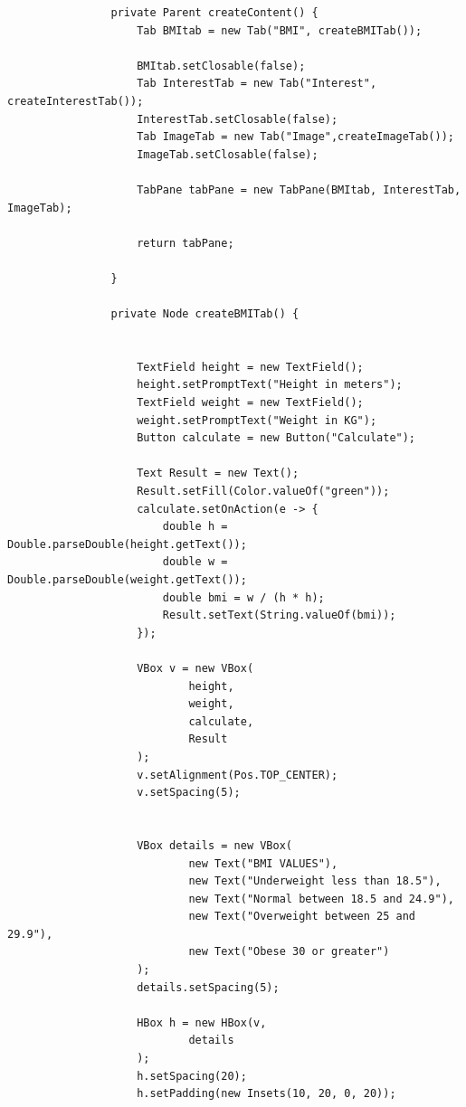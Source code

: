 \documentclass{book}
\begin{document}
{\begin{enumerate}
\begin{verbatim}
                private Parent createContent() {
                    Tab BMItab = new Tab("BMI", createBMITab());

                    BMItab.setClosable(false);
                    Tab InterestTab = new Tab("Interest", createInterestTab());
                    InterestTab.setClosable(false);
                    Tab ImageTab = new Tab("Image",createImageTab());
                    ImageTab.setClosable(false);

                    TabPane tabPane = new TabPane(BMItab, InterestTab, ImageTab);

                    return tabPane;

                }

                private Node createBMITab() {


                    TextField height = new TextField();
                    height.setPromptText("Height in meters");
                    TextField weight = new TextField();
                    weight.setPromptText("Weight in KG");
                    Button calculate = new Button("Calculate");

                    Text Result = new Text();
                    Result.setFill(Color.valueOf("green"));
                    calculate.setOnAction(e -> {
                        double h = Double.parseDouble(height.getText());
                        double w = Double.parseDouble(weight.getText());
                        double bmi = w / (h * h);
                        Result.setText(String.valueOf(bmi));
                    });

                    VBox v = new VBox(
                            height,
                            weight,
                            calculate,
                            Result
                    );
                    v.setAlignment(Pos.TOP_CENTER);
                    v.setSpacing(5);


                    VBox details = new VBox(
                            new Text("BMI VALUES"),
                            new Text("Underweight less than 18.5"),
                            new Text("Normal between 18.5 and 24.9"),
                            new Text("Overweight between 25 and 29.9"),
                            new Text("Obese 30 or greater")
                    );
                    details.setSpacing(5);

                    HBox h = new HBox(v,
                            details
                    );
                    h.setSpacing(20);
                    h.setPadding(new Insets(10, 20, 0, 20));


\end{verbatim}
\end{enumerate}}
\end{document}
